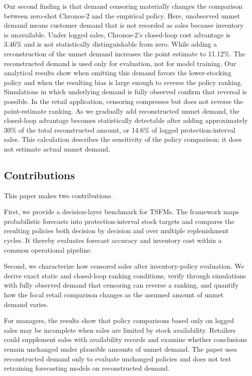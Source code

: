 \documentclass[msom,dblanonrev]{informs4}
\begin{document}
Our second finding is that demand censoring materially changes the comparison between zero-shot Chronos-2 and the empirical policy. Here, unobserved unmet demand means customer demand that is not recorded as sales because inventory is unavailable. 
Under logged sales, Chronos-2's closed-loop cost advantage is 3.46\% and is not statistically distinguishable from zero. While adding a reconstruction of the unmet demand increases the point estimate to 11.12\%. The reconstructed demand is used only for evaluation, not for model training.
Our analytical results show when omitting this demand favors the lower-stocking policy and when the resulting bias is large enough to reverse the policy ranking. Simulations in which underlying demand is fully observed confirm that reversal is possible. In the retail application, censoring compresses but does not reverse the point-estimate ranking. 
As we gradually add reconstructed unmet demand, the closed-loop advantage becomes statistically detectable after adding approximately 30\% of the total reconstructed amount, or 14.6\% of logged protection-interval sales. This calculation describes the sensitivity of the policy comparison; it does not estimate actual unmet demand.

\subsection{Contributions}

This paper makes two contributions.

First, we provide a decision-layer benchmark for TSFMs. The framework maps probabilistic forecasts into protection-interval stock targets and compares the resulting policies both decision by decision and over multiple replenishment cycles. It thereby evaluates forecast accuracy and inventory cost within a common operational pipeline.

Second, we characterize how censored sales alter inventory-policy evaluation. We derive exact static and closed-loop ranking conditions, verify through simulations with fully observed demand that censoring can reverse a ranking, and quantify how the focal retail comparison changes as the assumed amount of unmet demand varies.

For managers, the results show that policy comparisons based only on logged sales may be incomplete when sales are limited by stock availability. Retailers could supplement sales with availability records and examine whether conclusions remain unchanged under plausible amounts of unmet demand. The paper uses reconstructed demand only to evaluate unchanged policies and does not test retraining forecasting models on reconstructed demand.
\end{document}
